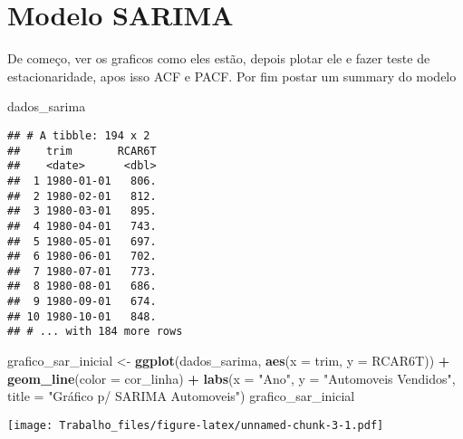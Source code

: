 \documentclass[
]{article}
\newenvironment{Shaded}{\begin{snugshade}}{\end{snugshade}}
\newcommand{\AttributeTok}[1]{\textcolor[rgb]{0.13,0.29,0.53}{#1}}
\newcommand{\FunctionTok}[1]{\textcolor[rgb]{0.13,0.29,0.53}{\textbf{#1}}}
\newcommand{\NormalTok}[1]{#1}
\newcommand{\OtherTok}[1]{\textcolor[rgb]{0.56,0.35,0.01}{#1}}
\newcommand{\SpecialCharTok}[1]{\textcolor[rgb]{0.81,0.36,0.00}{\textbf{#1}}}
\newcommand{\StringTok}[1]{\textcolor[rgb]{0.31,0.60,0.02}{#1}}
\begin{document}
\hypertarget{modelo-sarima}{%
\section{Modelo SARIMA}\label{modelo-sarima}}

De começo, ver os graficos como eles estão, depois plotar ele e fazer
teste de estacionaridade, apos isso ACF e PACF. Por fim postar um
summary do modelo

\begin{Shaded}
\begin{Highlighting}[]
\NormalTok{dados\_sarima}
\end{Highlighting}
\end{Shaded}

\begin{verbatim}
## # A tibble: 194 x 2
##    trim       RCAR6T
##    <date>      <dbl>
##  1 1980-01-01   806.
##  2 1980-02-01   812.
##  3 1980-03-01   895.
##  4 1980-04-01   743.
##  5 1980-05-01   697.
##  6 1980-06-01   702.
##  7 1980-07-01   773.
##  8 1980-08-01   686.
##  9 1980-09-01   674.
## 10 1980-10-01   848.
## # ... with 184 more rows
\end{verbatim}

\begin{Shaded}
\begin{Highlighting}[]
\NormalTok{grafico\_sar\_inicial }\OtherTok{\textless{}{-}} \FunctionTok{ggplot}\NormalTok{(dados\_sarima, }\FunctionTok{aes}\NormalTok{(}\AttributeTok{x =}\NormalTok{ trim, }\AttributeTok{y =}\NormalTok{ RCAR6T)) }\SpecialCharTok{+}
  \FunctionTok{geom\_line}\NormalTok{(}\AttributeTok{color =}\NormalTok{ cor\_linha) }\SpecialCharTok{+}
  \FunctionTok{labs}\NormalTok{(}\AttributeTok{x =} \StringTok{"Ano"}\NormalTok{, }\AttributeTok{y =} \StringTok{"Automoveis Vendidos"}\NormalTok{, }\AttributeTok{title =} \StringTok{"Gráfico p/ SARIMA Automoveis"}\NormalTok{)}
\NormalTok{grafico\_sar\_inicial}
\end{Highlighting}
\end{Shaded}

\texttt{[image: Trabalho\_files/figure-latex/unnamed-chunk-3-1.pdf]}

\begin{Shaded}
\end{Shaded}
\end{document}
